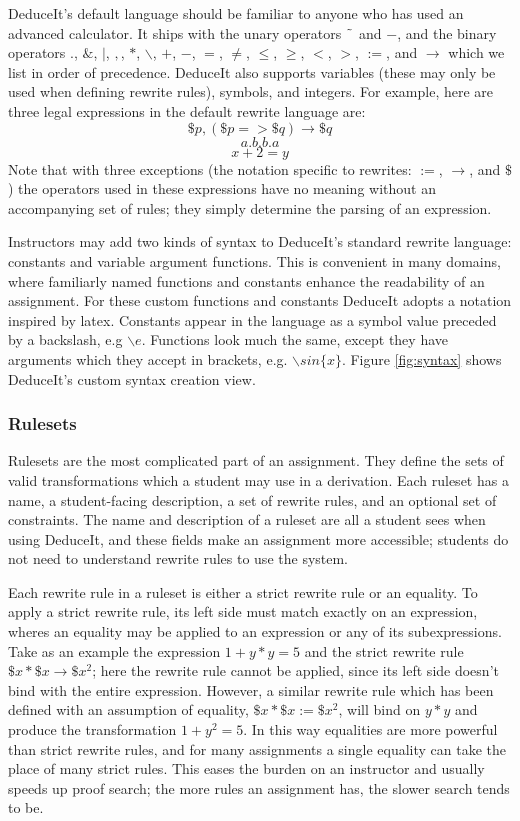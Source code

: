 \documentclass{sigchi}
\begin{document}
DeduceIt's default language should be familiar to anyone who has used an advanced calculator. It ships with the unary operators $\char`\~$ and $-$, and the binary operators $.$, $\&$, $|$, $,$, $*$, $\backslash$, $+$, $-$, $=$, $\neq$, $\leq$, $\geq$, $<$, $>$, $:=$, and $\rightarrow$ which we list in order of precedence. DeduceIt also supports variables (these may only be used when defining rewrite rules), symbols, and integers. For example, here are three legal expressions in the default rewrite language are: 
$$\$p,(\$p=>\$q)\rightarrow{}\$q$$ 
$$a.b.b.a$$
$$x+2=y$$ 
Note that with three exceptions (the notation specific to rewrites: $:=$, $\rightarrow$, and $\$$) the operators used in these expressions have no meaning without an accompanying set of rules; they simply determine the parsing of an expression.

Instructors may add two kinds of syntax to DeduceIt's standard rewrite language: constants and variable argument functions. This is convenient in many domains, where familiarly named functions and constants enhance the readability of an assignment. For these custom functions and constants DeduceIt adopts a notation inspired by latex. Constants appear in the language as a symbol value preceded by a backslash, e.g $\backslash{}e$. Functions look much the same, except they have arguments which they accept in brackets, e.g. $\backslash{}sin\{x\}$. Figure \ref{fig:syntax} shows DeduceIt's custom syntax creation view.

\subsubsection{Rulesets}

Rulesets are the most complicated part of an assignment. They define the sets of valid transformations which a student may use in a derivation. Each ruleset has a name, a student-facing description, a set of rewrite rules, and an optional set of constraints. The name and description of a ruleset are all a student sees when using DeduceIt, and these fields  make an assignment more accessible; students do not need to understand rewrite rules to use the system.

Each rewrite rule in a ruleset is either a strict rewrite rule or an equality. To apply a strict rewrite rule, its left side must match exactly on an expression, wheres an equality may be applied to an expression or any of its subexpressions. Take as an example the expression $1+y*y=5$ and the strict rewrite rule $\$x*\$x \rightarrow \$x^2$; here the rewrite rule cannot be applied, since its left side doesn't bind with the entire expression. However, a similar rewrite rule which has been defined with an assumption of equality, $\$x*\$x := \$x^2$, will bind on $y*y$ and produce the transformation $1+y^2=5$. In this way equalities are more powerful than strict rewrite rules, and for many assignments a single equality can take the place of many strict rules. This eases the burden on an instructor and usually speeds up proof search; the more rules an assignment has, the slower search tends to be.
\end{document}
